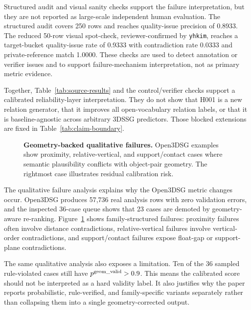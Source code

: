 Structured audit and visual sanity checks support the failure interpretation,
but they are not reported as large-scale independent human evaluation. The
structured audit covers 250 rows and reaches quality-issue precision of
0.8933. The reduced 50-row visual spot-check, reviewer-confirmed by
\texttt{yhkim}, reaches a target-bucket quality-issue rate of 0.9333 with
contradiction rate 0.0333 and private-reference match 1.0000. These checks are
used to detect annotation or verifier issues and to support failure-mechanism
interpretation, not as primary metric evidence.

Together, Table~\ref{tab:source-results} and the control/verifier checks
support a calibrated reliability-layer interpretation. They do not show that
H001 is a new relation generator, that it improves all open-vocabulary relation
labels, or that it is baseline-agnostic across arbitrary 3DSSG predictors.
Those blocked extensions are fixed in Table~\ref{tab:claim-boundary}.

\begin{figure}[t]
    \centering
    \caption{\textbf{Geometry-backed qualitative failures.} Open3DSG examples
    show proximity, relative-vertical, and support/contact cases where semantic
    plausibility conflicts with object-pair geometry. The rightmost case
    illustrates residual calibration risk.}
    \label{fig:failures}
\end{figure}

The qualitative failure analysis explains why the Open3DSG metric changes
occur. Open3DSG produces 57,736 real analysis rows with zero validation errors,
and the inspected 36-case queue shows that 23 cases are demoted by
geometry-aware re-ranking. Figure~\ref{fig:failures} shows family-structured
failures: proximity failures often involve distance contradictions,
relative-vertical failures involve vertical-order contradictions, and
support/contact failures expose float-gap or support-plane contradictions.

The same qualitative analysis also exposes a limitation. Ten of the 36 sampled
rule-violated cases still have $p^{\mathrm{geom\_valid}} > 0.9$. This means the calibrated score
should not be interpreted as a hard validity label. It also justifies why the
paper reports probabilistic, rule-verified, and family-specific variants
separately rather than collapsing them into a single geometry-corrected output.
